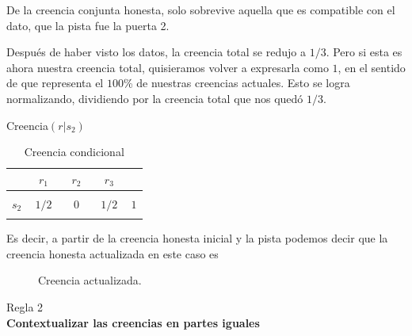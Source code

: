 \documentclass[a4paper,10pt]{book}
\begin{document}
De la creencia conjunta honesta, solo sobrevive aquella que es compatible con el dato, que la pista fue la puerta 2.
 
\vspace{0.3cm}

Después de haber visto los datos, la creencia total se redujo a $1/3$.
Pero si esta es ahora nuestra creencia total, quisieramos volver a expresarla como $1$, en el sentido de que representa el $100$\% de nuestras creencias actuales.
Esto se logra normalizando, dividiendo por la creencia total que nos quedó $1/3$.
\begin{table}[H]
\centering
Creencia$(r|s_2)$ \\ \vspace{0.3cm}
 \begin{tabular}{c|c|c|c||c} \setlength\tabcolsep{0.4cm} 
        & \, $r_1$ \, &  \, $r_2$ \, & \, $r_3$ \, &  \phantom{\bm{$1/3$}} \\ \hline 
  &  &  &  & \\ \hline
  $s_2$ & $1/2$ & $0$ & $1/2$ & $1$ \\ \hline
  &  &  & &  \\ 
\end{tabular}
\caption{Creencia condicional}
\label{tab:creencia_condicional}
\end{table}

Es decir, a partir de la creencia honesta inicial y la pista podemos decir que la creencia honesta actualizada en este caso es
\begin{figure}[H]
 \centering
{} 
\caption{Creencia actualizada.}
\label{fig:creencia_condicional}
\end{figure}

\begin{framed} \centering
  Regla 2 \\
\textbf{Contextualizar las creencias en partes iguales} 
\end{framed}
\end{document}
